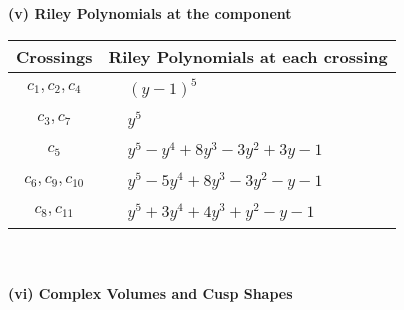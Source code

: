 \documentclass[1p]{elsarticle_modified}
\theoremstyle{definition}
\begin{document}
\newpage\renewcommand{\arraystretch}{1}
\flushleft \textbf{(v) Riley Polynomials at the component}\newline \\
\begin{tabular}{m{50pt}|m{274pt}}
Crossings & \hspace{64pt}Riley Polynomials at each crossing \\
\hline $$\begin{aligned}c_{1},c_{2},c_{4}\end{aligned}$$&$\begin{aligned}
&(y-1)^5
\end{aligned}$\\
\hline $$\begin{aligned}c_{3},c_{7}\end{aligned}$$&$\begin{aligned}
&y^5
\end{aligned}$\\
\hline $$\begin{aligned}c_{5}\end{aligned}$$&$\begin{aligned}
&y^5- y^4+8 y^3-3 y^2+3 y-1
\end{aligned}$\\
\hline $$\begin{aligned}c_{6},c_{9},c_{10}\end{aligned}$$&$\begin{aligned}
&y^5-5 y^4+8 y^3-3 y^2- y-1
\end{aligned}$\\
\hline $$\begin{aligned}c_{8},c_{11}\end{aligned}$$&$\begin{aligned}
&y^5+3 y^4+4 y^3+y^2- y-1
\end{aligned}$\\
\hline
\end{tabular}\\~\\
\newpage\flushleft \textbf{(vi) Complex Volumes and Cusp Shapes}
\end{document}
